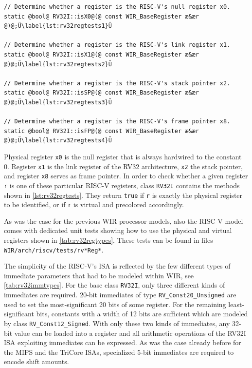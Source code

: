 \begin{lstlisting}[style=code,float=h,caption={Testing of Physical Register Properties of Class \texttt{RV32I}},label=lst:rv32regtests]
// Determine whether a register is the RISC-V's null register x0.
static @bool@ RV32I::isX0@(@ const WIR_BaseRegister æ&ær @)@;Ü\label{lst:rv32regtests1}Ü

// Determine whether a register is the RISC-V's link register x1.
static @bool@ RV32I::isX1@(@ const WIR_BaseRegister æ&ær @)@;Ü\label{lst:rv32regtests2}Ü

// Determine whether a register is the RISC-V's stack pointer x2.
static @bool@ RV32I::isSP@(@ const WIR_BaseRegister æ&ær @)@;Ü\label{lst:rv32regtests3}Ü

// Determine whether a register is the RISC-V's frame pointer x8.
static @bool@ RV32I::isFP@(@ const WIR_BaseRegister æ&ær @)@;Ü\label{lst:rv32regtests4}Ü
\end{lstlisting}

Physical register \texttt{x0} is the null register that is always hardwired to the constant 0.
Register \texttt{x1} is the link register of the RV32 architecture, \texttt{x2} the stack pointer, and register \texttt{x8} serves as frame pointer.
In order to check whether a given register \texttt{r} is one of these particular RISC-V registers, class \texttt{RV32I} contains the methods shown in \cref{lst:rv32regtests}.
They return \texttt{true} if \texttt{r} is exactly the physical register to be identified, or if \texttt{r} is virtual and precolored accordingly.

As was the case for the previous \gls{WIR} processor models, also the RISC-V model comes with dedicated unit tests showing how to use the physical and virtual registers shown in \cref{tab:rv32regtypes}.
These tests can be found in files \texttt{WIR/arch/riscv/tests/rv*Reg*}.

The simplicity of the RISC-V's \gls{ISA} is reflected by the few different types of immediate parameters that had to be modeled within \gls{WIR}, see \cref{tab:rv32immtypes}.
For the base class \texttt{RV32I}, only three different kinds of immediates are required.
20-bit immediates of type \texttt{RV\_Const20\_Unsigned} are used to set the most-significant 20 bits of some register.
For the remaining least-significant bits, constants with a width of 12 bits are sufficient which are modeled by class \texttt{RV\_Const12\_Signed}.
With only these two kinds of immediates, any 32-bit value can be loaded into a register and all arithmetic operations of the RV32I \gls{ISA} exploiting immediates can be expressed.
As was the case already before for the MIPS and the TriCore \glspl{ISA}, specialized 5-bit immediates are required to encode shift amounts.

